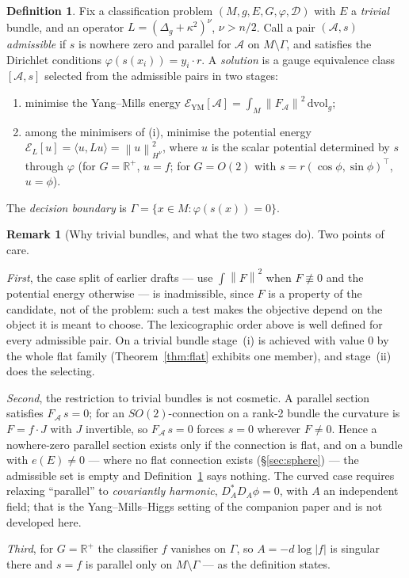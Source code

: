 \documentclass[11pt, a4paper]{article}
\theoremstyle{plain}
\theoremstyle{definition}
\newtheorem{definition}[theorem]{Definition}
\newtheorem{remark}[theorem]{Remark}
\newcommand{\R}{\mathbb{R}}
\newcommand{\Sig}{\mathcal{A}}
\newcommand{\Gam}{\Gamma}
\newcommand{\norm}[1]{\left\|#1\right\|}
\begin{document}
\begin{definition}\label{def:solution}
Fix a classification problem $(M,g,E,G,\varphi,\mathcal{D})$ with $E$ a
\emph{trivial} bundle, and an operator $L = (\Delta_g+\kappa^2)^\nu$,
$\nu > n/2$. Call a pair $(\Sig, s)$ \emph{admissible} if $s$ is nowhere zero
and parallel for $\Sig$ on $M \setminus \Gam$, and satisfies the Dirichlet
conditions $\varphi(s(x_i)) = y_i \cdot r$. A \emph{solution} is a gauge
equivalence class $[\Sig, s]$ selected from the admissible pairs in two stages:
\begin{enumerate}[label=(\roman*), itemsep=2pt]
  \item minimise the Yang--Mills energy
        $\mathcal{E}_{\mathrm{YM}}[\Sig] = \int_M\norm{F_\Sig}^2\,\mathrm{dvol}_g$;
  \item among the minimisers of (i), minimise the potential energy
        $\mathcal{E}_L[u] = \langle u, Lu\rangle = \norm{u}^2_{H^\nu}$,
        where $u$ is the scalar potential determined by $s$ through $\varphi$
        (for $G=\R^+$, $u = f$; for $G=O(2)$ with $s = r(\cos\phi,\sin\phi)^\top$,
        $u = \phi$).
\end{enumerate}
The \emph{decision boundary} is $\Gam = \{x \in M : \varphi(s(x)) = 0\}$.
\end{definition}

\begin{remark}[Why trivial bundles, and what the two stages do]\label{rem:two-stage}
Two points of care.

\emph{First}, the case split of earlier drafts --- use $\int\norm{F}^2$ when
$F \not\equiv 0$ and the potential energy otherwise --- is inadmissible, since
$F$ is a property of the candidate, not of the problem: such a test makes the
objective depend on the object it is meant to choose. The lexicographic order
above is well defined for every admissible pair. On a trivial bundle stage~(i)
is achieved with value $0$ by the whole flat family
(Theorem~\ref{thm:flat} exhibits one member), and stage~(ii) does the selecting.

\emph{Second}, the restriction to trivial bundles is not cosmetic. A parallel
section satisfies $F_\Sig\, s = 0$; for an $SO(2)$-connection on a rank-2 bundle
the curvature is $F = f\!\cdot\!J$ with $J$ invertible, so $F_\Sig\,s = 0$ forces
$s = 0$ wherever $F \neq 0$. Hence a nowhere-zero parallel section exists only
if the connection is flat, and on a bundle with $e(E) \neq 0$ --- where no flat
connection exists (\S\ref{sec:sphere}) --- the admissible set is empty and
Definition~\ref{def:solution} says nothing. The curved case requires relaxing
``parallel'' to \emph{covariantly harmonic}, $D_A^*D_A\phi = 0$, with $A$ an
independent field; that is the Yang--Mills--Higgs setting of the companion paper
\cite{Vasii2026Paper2} and is not developed here.

\emph{Third}, for $G = \R^+$ the classifier $f$ vanishes on $\Gam$, so
$A = -d\log|f|$ is singular there and $s = f$ is parallel only on
$M\setminus\Gam$ --- as the definition states.
\end{remark}
\end{document}
